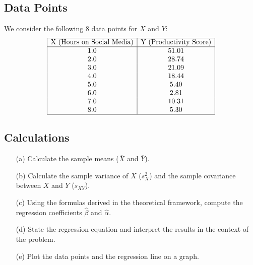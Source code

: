 \documentclass[11pt]{article}
\begin{document}
\subsection*{Data Points}
We consider the following 8 data points for \(X\) and \(Y\):
\[
\begin{array}{|c|c|}
\hline
    \text{X (Hours on Social Media)} & \text{Y (Productivity Score)} \\ \hline
    1.0 & 51.01 \\
    2.0 & 28.74 \\
    3.0 & 21.09 \\
    4.0 & 18.44 \\
    5.0 & 5.40 \\
    6.0 & 2.81 \\
    7.0 & 10.31 \\
    8.0 & 5.30 \\ \hline
\end{array}
\]

\subsection*{Calculations}
\begin{itemize}
    \item[(a)] Calculate the sample means (\(\overline{X}\) and \(\overline{Y}\)).
    \item[(b)] Calculate the sample variance of \(X\) (\(s_X^2\)) and the sample covariance between \(X\) and \(Y\) (\(s_{XY}\)).
    \item[(c)] Using the formulas derived in the theoretical framework, compute the regression coefficients \(\hat{\beta}\) and \(\hat{\alpha}\).
    \item[(d)] State the regression equation and interpret the results in the context of the problem.
    \item[(e)] Plot the data points and the regression line on a graph.
\end{itemize}
\end{document}

